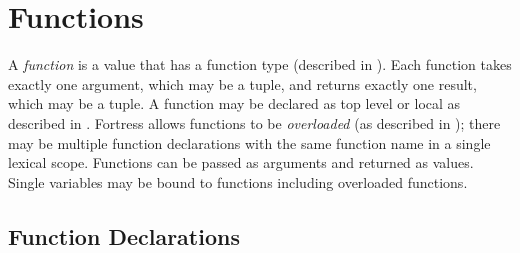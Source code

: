 %
%
%
%

\chapter{Functions}


A \emph{function} is a value that has a function type
(described in ).
Each function takes exactly one argument, which may be a tuple, and returns
exactly one result, which may be a tuple.
A function may be declared as top level or local as described
in .
Fortress allows functions to be \emph{overloaded} (as described in
); there may be multiple function
declarations with the same function name in a single lexical scope.
Functions can be passed as arguments and returned as values.
Single variables may be bound to functions
including overloaded functions.

\section{Function Declarations}

